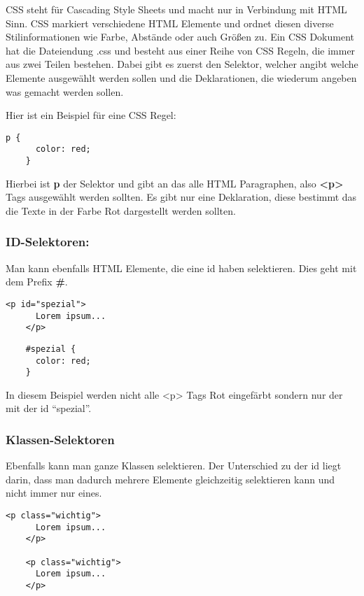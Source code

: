 CSS steht für Cascading Style Sheets und macht nur in Verbindung mit HTML Sinn. CSS markiert verschiedene HTML Elemente und ordnet diesen diverse Stilinformationen wie Farbe, Abstände oder auch Größen zu. Ein CSS Dokument hat die Dateiendung .css und besteht aus einer Reihe von CSS Regeln, die immer aus zwei Teilen bestehen. Dabei gibt es zuerst den Selektor, welcher angibt welche Elemente ausgewählt werden sollen und die Deklarationen, die wiederum angeben was gemacht werden sollen.

Hier ist ein Beispiel für eine CSS Regel:

\begin{lstlisting}[caption=Beispiel CSS Regel]
    p {
      color: red;
    }
\end{lstlisting}

Hierbei ist \textbf{p} der Selektor und gibt an das alle HTML Paragraphen, also \textbf{<p>} Tags ausgewählt werden sollten. Es gibt nur eine Deklaration, diese bestimmt das die Texte in der Farbe Rot dargestellt werden sollten.

\subsubsection{ID-Selektoren:}
Man kann ebenfalls HTML Elemente, die eine id haben selektieren. Dies geht mit dem Prefix \textbf{\#}.

\begin{lstlisting}[caption=Beispiel ID-Selektor]
    <p id="spezial">
      Lorem ipsum...
    </p>
\end{lstlisting}

\begin{lstlisting}
    #spezial {
      color: red;
    }
\end{lstlisting}

In diesem Beispiel werden nicht alle <p> Tags Rot eingefärbt sondern nur der mit der id “spezial”.

\subsubsection{Klassen-Selektoren}
Ebenfalls kann man ganze Klassen selektieren. Der Unterschied zu der id liegt darin, dass man dadurch mehrere Elemente gleichzeitig selektieren kann und nicht immer nur eines.

\begin{lstlisting}[caption=Beispiel Klassen-Selektor]
    <p class="wichtig">
      Lorem ipsum...
    </p>
    
    <p class="wichtig">
      Lorem ipsum...
    </p>
\end{lstlisting}

